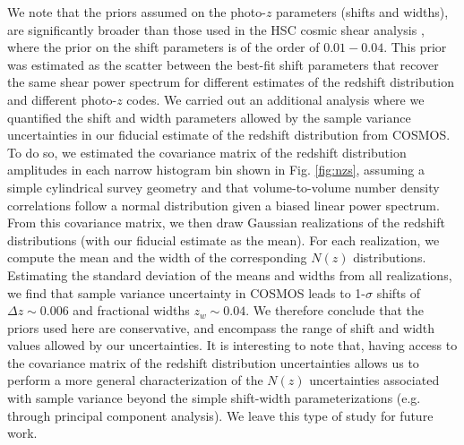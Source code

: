 \documentclass[a4paper,11pt]{article}
\begin{document}
We note that the priors assumed on the photo-$z$ parameters (shifts and widths), are significantly broader than those used in the HSC cosmic shear analysis \cite{2019PASJ...71...43H}, where the prior on the shift parameters is of the order of $0.01-0.04$. This prior was estimated as the scatter between the best-fit shift parameters that recover the same shear power spectrum for different estimates of the redshift distribution and different photo-$z$ codes. We carried out an additional analysis where we quantified the shift and width parameters allowed by the sample variance uncertainties in our fiducial estimate of the redshift distribution from COSMOS. To do so, we estimated the covariance matrix of the redshift distribution amplitudes in each narrow histogram bin shown in Fig. \ref{fig:nzs}, assuming a simple cylindrical survey geometry and that volume-to-volume number density correlations follow a normal distribution given a biased linear power spectrum. From this covariance matrix, we then draw Gaussian realizations of the redshift distributions (with our fiducial estimate as the mean). For each realization, we compute the mean and the width of the corresponding $N(z)$ distributions. Estimating the standard deviation of the means and widths from all realizations, we find that sample variance uncertainty in COSMOS leads to 1-$\sigma$ shifts of $\Delta z\sim0.006$ and fractional widths $z_w\sim 0.04$. We therefore conclude that the priors used here are conservative, and encompass the range of shift and width values allowed by our uncertainties. It is interesting to note that, having access to the covariance matrix of the redshift distribution uncertainties  allows us to perform a more general characterization of the $N(z)$ uncertainties associated with sample variance beyond the simple shift-width parameterizations (e.g. through principal component analysis). We leave this type of study for future work.
\end{document}
